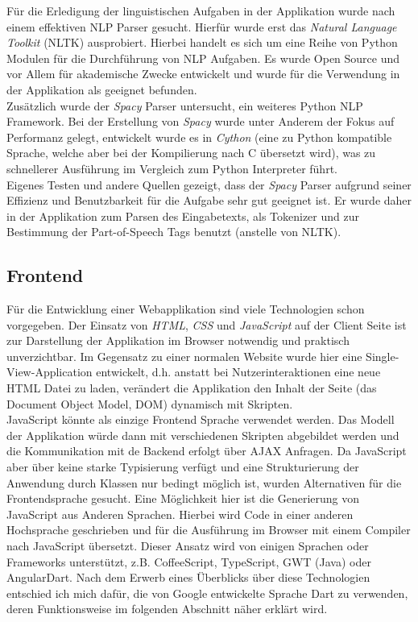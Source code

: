 Für die Erledigung der linguistischen Aufgaben in der Applikation wurde nach einem effektiven NLP Parser gesucht. Hierfür wurde erst das \textit{Natural Language Toolkit} (NLTK)\cite{Bird2004a} ausprobiert. Hierbei handelt es sich um eine Reihe von Python Modulen für die Durchführung von NLP Aufgaben. Es wurde Open Source und vor Allem für akademische Zwecke entwickelt und wurde für die Verwendung in der Applikation als geeignet befunden.\\
Zusätzlich wurde der \textit{Spacy} Parser untersucht, ein weiteres Python NLP Framework. Bei der Erstellung von \textit{Spacy} wurde unter Anderem der Fokus auf Performanz gelegt, entwickelt wurde es in \textit{Cython} (eine zu Python kompatible Sprache, welche aber bei der Kompilierung nach C übersetzt wird), was zu schnellerer Ausführung im Vergleich zum Python Interpreter führt.\\
Eigenes Testen und andere Quellen gezeigt, dass der \textit{Spacy} Parser aufgrund seiner Effizienz\cite{Stent2015} und Benutzbarkeit für die Aufgabe sehr gut geeignet ist. Er wurde daher in der Applikation zum Parsen des Eingabetexts, als Tokenizer und zur Bestimmung der Part-of-Speech Tags benutzt (anstelle von NLTK).

\subsection{Frontend}

Für die Entwicklung einer Webapplikation sind viele Technologien schon vorgegeben. Der Einsatz von \textit{HTML}, \textit{CSS} und \textit{JavaScript} auf der Client Seite ist zur Darstellung der Applikation im Browser notwendig und praktisch unverzichtbar. Im Gegensatz zu einer normalen Website wurde hier eine Single-View-Application entwickelt, d.h. anstatt bei Nutzerinteraktionen eine neue HTML Datei zu laden, verändert die Applikation den Inhalt der Seite (das Document Object Model, DOM) dynamisch mit Skripten\cite{mikowski2013single}.\\

JavaScript könnte als einzige Frontend Sprache verwendet werden. Das Modell der Applikation würde dann mit verschiedenen Skripten abgebildet werden und die Kommunikation mit de Backend erfolgt über AJAX Anfragen. Da JavaScript aber über keine starke Typisierung verfügt und eine Strukturierung der Anwendung durch Klassen nur bedingt möglich ist, wurden Alternativen für die Frontendsprache gesucht. Eine Möglichkeit hier ist die Generierung von JavaScript aus Anderen Sprachen. Hierbei wird Code in einer anderen Hochsprache geschrieben und für die Ausführung im Browser mit einem Compiler nach JavaScript übersetzt. Dieser Ansatz wird von einigen Sprachen oder Frameworks unterstützt, z.B. CoffeeScript, TypeScript, GWT (Java) oder AngularDart. Nach dem Erwerb eines Überblicks über diese Technologien entschied ich mich dafür, die von Google entwickelte Sprache Dart zu verwenden, deren Funktionsweise im folgenden Abschnitt näher erklärt wird.

